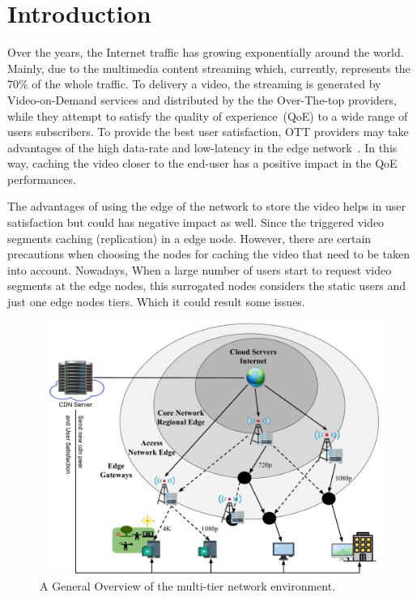 \section{Introduction}
\label{sec:introduction}


Over the years, the Internet traffic has growing exponentially around the world. Mainly, due to the multimedia content streaming which, currently, represents the 70\% of the whole traffic. To delivery a video, the streaming is generated by Video-on-Demand services and distributed by the the Over-The-top providers, while they attempt to satisfy the quality of experience~(QoE) to a wide range of users subscribers. To provide the best user satisfaction, OTT providers may take advantages of the high data-rate and low-latency in the edge network~\cite{DBLP:CoRR:2021}. In this way, caching the video closer to the end-user has a positive impact in the QoE performances.

The advantages of using the edge of the network to store the video helps in user satisfaction but could has negative impact as well. Since the triggered video segments caching (replication) in a edge node.
However, there are certain precautions when choosing the nodes for caching the video that need to be taken into account. 
Nowadays, When a large number of users start to request video segments at the edge nodes, this surrogated nodes considers the static users and just one edge nodes tiers. Which it could result some issues. 

\begin{figure}
    \centering
    \includegraphics[width=0.9\linewidth]{images/arch-video-content.pdf}
    \caption{A General Overview of the multi-tier network environment.}
    \label{fig:impact-two-layers}
\end{figure}


